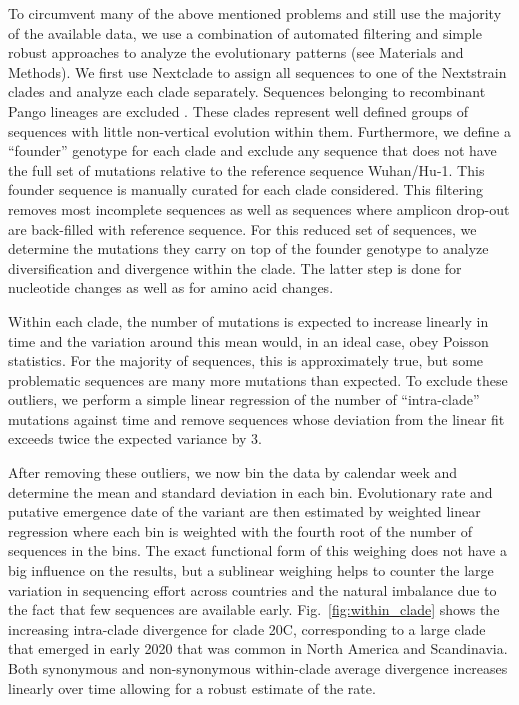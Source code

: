 \documentclass[aps,rmp, twocolumn]{revtex4}
\begin{document}
To circumvent many of the above mentioned problems and still use the majority of the available data, we use a combination of automated filtering and simple robust approaches to analyze the evolutionary patterns (see Materials and Methods).
We first use Nextclade \citep{aksamentov_nextclade_2021} to assign all sequences to one of the Nextstrain clades \citep{hadfield_nextstrain_2018} and analyze each clade separately.
Sequences belonging to recombinant Pango lineages are excluded \citep{rambaut_dynamic_2020}.
These clades represent well defined groups of sequences with little non-vertical evolution within them.
Furthermore, we define a ``founder'' genotype for each clade and exclude any sequence that does not have the full set of mutations relative to the reference sequence Wuhan/Hu-1.
This founder sequence is manually curated for each clade considered.
This filtering removes most incomplete sequences as well as sequences where amplicon drop-out are back-filled with reference sequence.
For this reduced set of sequences, we determine the mutations they carry on top of the founder genotype to analyze diversification and divergence within the clade.
The latter step is done for nucleotide changes as well as for amino acid changes.

Within each clade, the number of mutations is expected to increase linearly in time and the variation around this mean would, in an ideal case, obey Poisson statistics.
For the majority of sequences, this is approximately true, but some problematic sequences are many more mutations than expected.
To exclude these outliers, we perform a simple linear regression of the number of ``intra-clade'' mutations against time and remove sequences whose deviation from the linear fit exceeds twice the expected variance by 3.


After removing these outliers, we now bin the data by calendar week and determine the mean and standard deviation in each bin.
Evolutionary rate and putative emergence date of the variant are then estimated by weighted linear regression where each bin is weighted with the fourth root of the number of sequences in the bins.
The exact functional form of this weighing does not have a big influence on the results, but a sublinear weighing helps to counter the large variation in sequencing effort across countries and the natural imbalance due to the fact that few sequences are available early.
Fig.~\ref{fig:within_clade} shows the increasing intra-clade divergence for clade 20C, corresponding to a large clade that emerged in early 2020 that was common in North America and Scandinavia.
Both synonymous and non-synonymous within-clade average divergence increases linearly over time allowing for a robust estimate of the rate.
\end{document}
